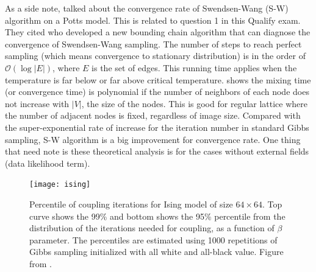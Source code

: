 \documentclass[12pt]{article}
\begin{document}
As a side note, \citep{barbu2005generalizing} talked about the convergence rate
of Swendsen-Wang (S-W) algorithm on a Potts model. This is related to question 1
in this Qualify exam. They cited \citet{huber2003bounding} who developed a new
bounding chain algorithm that can diagnose the convergence of Swendsen-Wang
sampling. The number of steps to reach perfect sampling (which means convergence
to stationary distribution) is in the order of $\mathcal{O}(\log |E|)$, where
$E$ is the set of edges. This running time applies when the temperature is far
below or far above critical temperature. \citet{cooper1999mixing} shows the
mixing time (or convergence time) is polynomial if the number of neighbors of
each node does not increase with $|V|$, the size of the nodes. This is good for
regular lattice where the number of adjacent nodes is fixed, regardless of image
size. Compared with the super-exponential rate of increase for the iteration
number in standard Gibbs sampling, S-W algorithm is a big improvement for
convergence rate. One thing that need note is these theoretical analysis is for
the cases without external fields (data likelihood term). 

\begin{figure}
  \centering
  \texttt{[image: ising]}
  \caption{Percentile of coupling iterations for Ising model of size $64\times
    64$. Top curve shows the 99\% and bottom shows the 95\% percentile from the
    distribution of the iterations needed for coupling, as a function of $\beta$
    parameter.  The percentiles are estimated using 1000 repetitions of Gibbs
    sampling initialized with all white and all-black value. Figure from
    \citet{johnson1996studying}. }
\label{fig:ising}
\end{figure}

 

\end{document}
